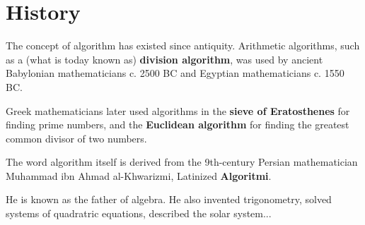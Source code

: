 \documentclass{beamer}
\newcommand{\bfemph}[1]{\textbf{#1}}
\renewcommand{\emph}[1]{\bfemph{#1}}
\begin{document}
\section{History}

\begin{frame}
    The concept of algorithm has existed since antiquity.  Arithmetic algorithms, such as a (what is today known as) \emph{division algorithm}, was used by ancient Babylonian mathematicians c. 2500 BC and Egyptian mathematicians c. 1550 BC.

    \bigskip

    Greek mathematicians later used algorithms in the \emph{sieve of Eratosthenes} for finding prime numbers, and the \emph{Euclidean algorithm} for finding the greatest common divisor of two numbers.
\end{frame}

\begin{frame}

    The word algorithm itself is derived from the 9th-century Persian mathematician Muhammad ibn Ahmad al-Khwarizmi, Latinized \emph{Algoritmi}.

    \bigskip

    He is known as the father of algebra. He also invented trigonometry, solved systems of quadratric equations, described the solar system...

\end{frame}
\end{document}
